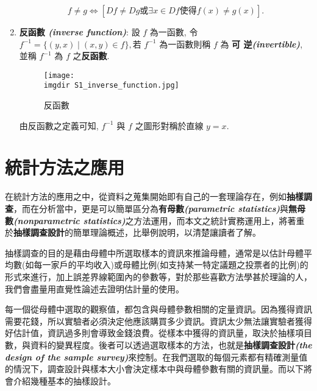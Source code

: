 \begin{enumerate}
{			$$ f \neq g \Leftrightarrow \left[ Df \neq Dg \mbox{或} \exists x \in Df 				\mbox{使得} f(x) \neq g(x) \right]. 
			$$
		}
		\item {\textbf{反函數   \emph{ (inverse function)}}: 設 $f$ 為一函數, 令 $f^{−1} 				= \{(y, x) \mid (x, y) \in f \}, $若 $f^{-1}$ 為一函數則稱 $f$ 為 \textbf{可				逆\emph{(invertible)}}, 並稱 $f^{−1}$ 為 $f$ 之\textbf{反函數}.
			\begin{figure}[H]	
		 	 	\centering	 			 	 
   			 	\texttt{[image: \\imgdir S1\_inverse\_function.jpg]} 
   				 \caption{反函數}   		
   				 \label{set:inverse_function}   			 		 
		 	\end{figure}
		 	由反函數之定義可知, $f^{−1}$ 與 $f$ 之圖形對稱於直線 $y = x$.
		}
	\end{enumerate}		
	\bigskip	  
	\section{統計方法之應用 {}}
	在統計方法的應用之中，從資料之蒐集開始即有自己的一套理論存在，例如\textbf{抽樣調查}，而在分析當中，更是可以簡單區分為\textbf{有母數\emph{(parametric statistics)}}與\textbf{無母數\emph{(nonparametric statistics)}}之方法運用，而本文之統計實務運用上，將著重於\textbf{抽樣調查設計}的簡單理論概述，比舉例說明，以清楚讓讀者了解。
	
	抽樣調查的目的是藉由母體中所選取樣本的資訊來推論母體，通常是以估計母體平均數(如每一家戶的平均收入)或母體比例(如支持某一特定議題之投票者的比例)的形式來進行，加上誤差界線範圍內的參數等，對於那些喜歡方法學甚於理論的人，我們會盡量用直覺性論述去證明估計量的使用。
	
	每一個從母體中選取的觀察值，都包含與母體參數相關的定量資訊。因為獲得資訊需要花錢，所以實驗者必須決定他應該購買多少資訊。資訊太少無法讓實驗者獲得好估計值，資訊過多則會導致金錢浪費。從樣本中獲得的資訊量，取決於抽樣項目數，與資料的變異程度。後者可以透過選取樣本的方法，也就是\textbf{抽樣調查設計\emph{(the design of the sample survey)}}來控制。在我們選取的每個元素都有精確測量值的情況下，調查設計與樣本大小會決定樣本中與母體參數有關的資訊量。而以下將會介紹幾種基本的抽樣設計。
